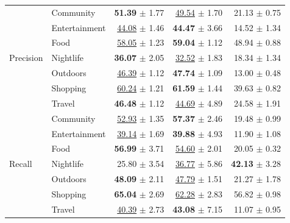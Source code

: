 \begin{table}[htbp]
\begin{tabular}{llrrr}
\midrule
\multirow{7}{*}{Precision} & Community     & \textbf{51.39} $\pm$ 1.77 & \underline{49.54} $\pm$ 1.70          & 21.13 $\pm$ 0.75 \\
                           & Entertainment & \underline{44.08} $\pm$ 1.46          & \textbf{44.47} $\pm$ 3.66 & 14.52 $\pm$ 1.34 \\
                           & Food          & \underline{58.05} $\pm$ 1.23          & \textbf{59.04} $\pm$ 1.12 & 48.94 $\pm$ 0.88 \\
                           & Nightlife     & \textbf{36.07} $\pm$ 2.05 & \underline{32.52} $\pm$ 1.83          & 18.34 $\pm$ 1.34 \\
                           & Outdoors      & \underline{46.39} $\pm$ 1.12          & \textbf{47.74} $\pm$ 1.09 & 13.00 $\pm$ 0.48 \\
                           & Shopping      & \underline{60.24} $\pm$ 1.21          & \textbf{61.59} $\pm$ 1.44 & 39.63 $\pm$ 0.82 \\
                           & Travel        & \textbf{46.48} $\pm$ 1.12 & \underline{44.69} $\pm$ 4.89          & 24.58 $\pm$ 1.91 \\
\midrule
\multirow{7}{*}{Recall}    & Community     & \underline{52.93} $\pm$ 1.35          & \textbf{57.37} $\pm$ 2.46 & 19.48 $\pm$ 0.99 \\
                           & Entertainment & \underline{39.14} $\pm$ 1.69          & \textbf{39.88} $\pm$ 4.93 & 11.90 $\pm$ 1.08 \\
                           & Food          & \textbf{56.99} $\pm$ 3.71 & \underline{54.60} $\pm$ 2.01          & 20.05 $\pm$ 0.32 \\
                           & Nightlife     & 25.80 $\pm$ 3.54          & \underline{36.77} $\pm$ 5.86 & \textbf{42.13} $\pm$ 3.28 \\
                           & Outdoors      & \textbf{48.09} $\pm$ 2.11 & \underline{47.79} $\pm$ 1.51          & 21.27 $\pm$ 1.78 \\
                           & Shopping      & \textbf{65.04} $\pm$ 2.69 & \underline{62.28} $\pm$ 2.83          & 56.82 $\pm$ 0.98 \\
                           & Travel        & \underline{40.39} $\pm$ 2.73          & \textbf{43.08} $\pm$ 7.15 & 11.07 $\pm$ 0.95 \\
\bottomrule
\end{tabular}
\end{table}
